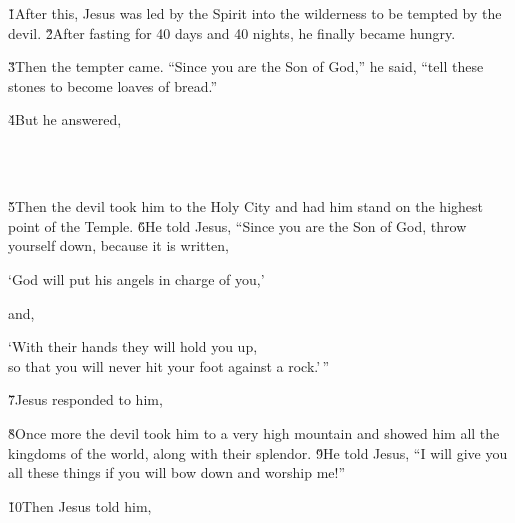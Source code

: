 \v{1}After this, Jesus was led by the Spirit into the wilderness to be tempted by the devil. \v{2}After fasting for 40 days and 40 nights, he finally became hungry.

\v{3}Then the tempter came. ``Since you are the Son of God,'' he said, ``tell these stones to become loaves of bread.''

\v{4}But he answered, 

\begin{poetry}
\poeml {} \\
\poemll    {} \\
\poemlll       {}
\end{poetry}

\v{5}Then the devil took him to the Holy City and had him stand on the highest point of the Temple. \v{6}He told Jesus, ``Since you are the Son of God, throw yourself down, because it is written,

\begin{poetry}
\poeml `God will put his angels in charge of you,'
\end{poetry}

and,

\begin{poetry}
\poeml `With their hands they will hold you up, \\
\poemll    so that you will never hit your foot against a rock.'\,''
\end{poetry}

\v{7}Jesus responded to him, 

\v{8}Once more the devil took him to a very high mountain and showed him all the kingdoms of the world, along with their splendor. \v{9}He told Jesus, ``I will give you all these things if you will bow down and worship me!''

\v{10}Then Jesus told him,  

